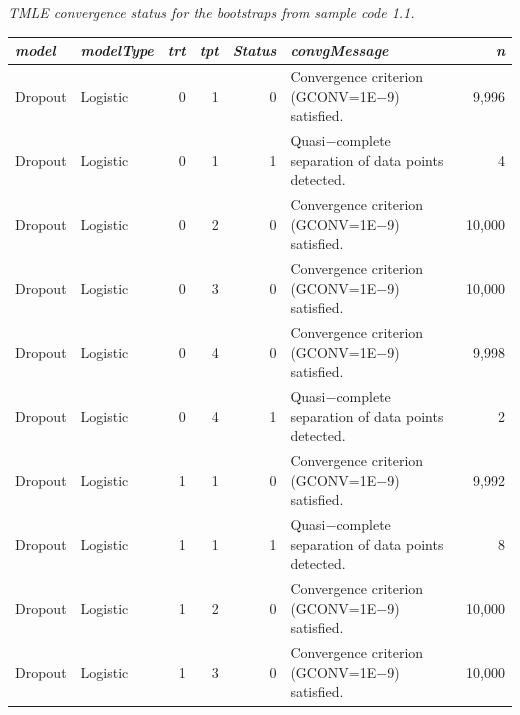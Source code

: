 \documentclass[10pt]{article}
\renewcommand{\baselinestretch}{1.3}
\begin{document}
\begin{minipage}{\textwidth}
\noindent%
\begin{flushleft}
{\renewcommand{\baselinestretch}{1.0}\selectfont
\begin{minipage}[l]{5.6in}
\normalsize\em%
TMLE convergence status for the bootstraps from sample code 1.1.\\
\end{minipage}}\vspace{-0.11in}%
 
\begin{minipage}[l]{5.6in}
{\renewcommand{\baselinestretch}{1.25}\selectfont\footnotesize\selectfont\noindent%
\begin{tabular}{|l|l|r|r|r|l|r|}\hline
\em   model & \em    modelType & \em    trt & \em    tpt & \em    Status & \em    convgMessage & \em    n\\\hline
   Dropout &    Logistic &    0 &    1 &            0 &    Convergence criterion (GCONV=1E$-$9) satisfied. &        9,996\\\hline
   Dropout &    Logistic &    0 &    1 &            1 &    Quasi$-$complete separation of data points detected. &            4\\\hline
   Dropout &    Logistic &    0 &    2 &            0 &    Convergence criterion (GCONV=1E$-$9) satisfied. &       10,000\\\hline
   Dropout &    Logistic &    0 &    3 &            0 &    Convergence criterion (GCONV=1E$-$9) satisfied. &       10,000\\\hline
   Dropout &    Logistic &    0 &    4 &            0 &    Convergence criterion (GCONV=1E$-$9) satisfied. &        9,998\\\hline
   Dropout &    Logistic &    0 &    4 &            1 &    Quasi$-$complete separation of data points detected. &            2\\\hline
   Dropout &    Logistic &    1 &    1 &            0 &    Convergence criterion (GCONV=1E$-$9) satisfied. &        9,992\\\hline
   Dropout &    Logistic &    1 &    1 &            1 &    Quasi$-$complete separation of data points detected. &            8\\\hline
   Dropout &    Logistic &    1 &    2 &            0 &    Convergence criterion (GCONV=1E$-$9) satisfied. &       10,000\\\hline
   Dropout &    Logistic &    1 &    3 &            0 &    Convergence criterion (GCONV=1E$-$9) satisfied. &       10,000\\\hline

\end{tabular}}
\end{minipage}
\end{flushleft}
\end{minipage}
\end{document}
